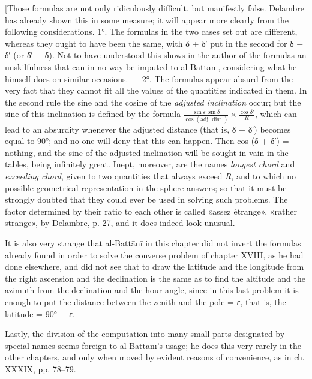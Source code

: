 \documentclass[11pt]{article}
\newcommand{\Pg}[1]{\marginpar{\footnotesize\color{gray}#1}}
\begin{document}
\par \Pg{I 199}[Those formulas are not only ridiculously difficult, but manifestly false. Delambre has already shown this in some measure; it will appear more clearly from the following considerations. 1°. The formulas in the two cases set out are different, whereas they ought to have been the same, with {\greekfont δ} + {\greekfont δ}′ put in the second for {\greekfont δ} − {\greekfont δ}′ (or {\greekfont δ}′ − {\greekfont δ}). Not to have understood this shows in the author of the formulas an unskilfulness that can in no way be imputed to al-Battānī, considering what he himself does on similar occasions. — 2°. The formulas appear absurd from the very fact that they cannot fit all the values of the quantities indicated in them. In the second rule the sine and the cosine of the \emph{adjusted inclination} occur; but the sine of this inclination is defined by the formula $\frac{\sin\varepsilon\,\sin\delta}{\cos(\text{adj. dist.})} \times \frac{\cos\delta'}{R}$, which can lead to an absurdity whenever the adjusted distance (that is, {\greekfont δ} + {\greekfont δ}′) becomes equal to 90°; and no one will deny that this can happen. Then cos ({\greekfont δ} + {\greekfont δ}′) = nothing, and the sine of the adjusted inclination will be sought in vain in the tables, being infinitely great. Inept, moreover, are the names \emph{longest chord} and \emph{exceeding chord}, given to two quantities that always exceed \emph{R}, and to which no possible geometrical representation in the sphere answers; so that it must be strongly doubted that they could ever be used in solving such problems. The factor determined by their ratio to each other is called «assez étrange», «rather strange», by Delambre, p. 27, and it does indeed look unusual.\par
\par It is also very strange that al-Battānī in this chapter did not invert the formulas already found in order to solve the converse problem of chapter XVIII, as he had done elsewhere, and did not see that to draw the latitude and the longitude from the right ascension and the declination is the same as to find the altitude and the azimuth from the declination and the hour angle, since in this last problem it is enough to put the distance between the zenith and the pole = {\greekfont ε}, that is, the latitude = 90° − {\greekfont ε}.\par
\par Lastly, the division of the computation into many small parts designated by special names seems foreign to al-Battānī's usage; he does this very rarely in the other chapters, and only when moved by evident reasons of convenience, as in ch. XXXIX, pp. 78–79.\par
\end{document}
